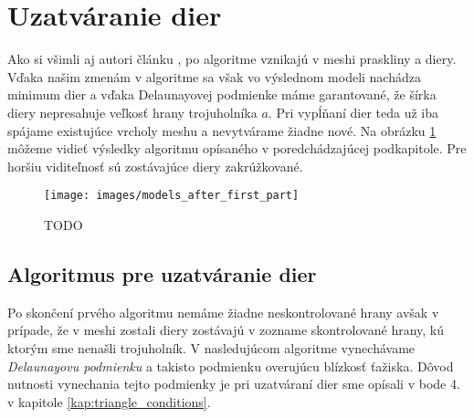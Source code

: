 \section{Uzatváranie dier}
Ako si všimli aj autori článku \cite{akkouche2001adaptive}, po algoritme vznikajú v meshi 
praskliny a diery. Vďaka našim zmenám v algoritme sa však vo výslednom modeli nachádza minimum dier 
a vďaka Delaunayovej podmienke máme garantované, že šírka diery nepresahuje veľkosť hrany trojuholníka
$a$. Pri vypĺňaní dier teda už iba spájame existujúce vrcholy meshu a nevytvárame žiadne nové.
Na obrázku \ref{obr:models_after_first_part} môžeme vidieť výsledky algoritmu opísaného v 
poredchádzajúcej podkapitole. Pre horšiu viditeľnosť sú zostávajúce diery zakrúžkované.

\begin{figure}
    \centerline{\texttt{[image: images/models\_after\_first\_part]}}
    \caption[TODO]{TODO}
    \label{obr:models_after_first_part}
\end{figure}

\subsection{Algoritmus pre uzatváranie dier}

Po skončení prvého algoritmu nemáme žiadne neskontrolované hrany avšak v prípade, že v meshi zostali 
diery zostávajú v zozname skontrolované hrany, kú ktorým sme nenašli trojuholník. V nasledujúcom 
algoritme vynechávame \textit{Delaunayovu podmienku} a takisto podmienku overujúcu blízkosť ťažiska. 
Dôvod nutnosti vynechania tejto podmienky je pri uzatváraní dier sme opísali v bode 4. v kapitole 
\ref{kap:triangle_conditions}.

